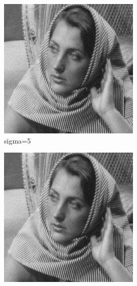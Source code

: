 \documentclass[12pt]{article}
\begin{document}
\begin{figure}[h]
    \centering
    \begin{subfigure}[b]{0.24\textwidth}
        \centering
        \includegraphics[width=\textwidth]{../images/noisy_barbara256.png}
        \caption{sigma=5}
        \label{Noisy }
    \end{subfigure}
    \begin{subfigure}[b]{0.24\textwidth}
        \centering
        \includegraphics[width=\textwidth]{../images/filtered_barbara256_meanshift_sigma_s_2_sigma_r_2.png}

\end{subfigure}
\end{figure}
\end{document}
